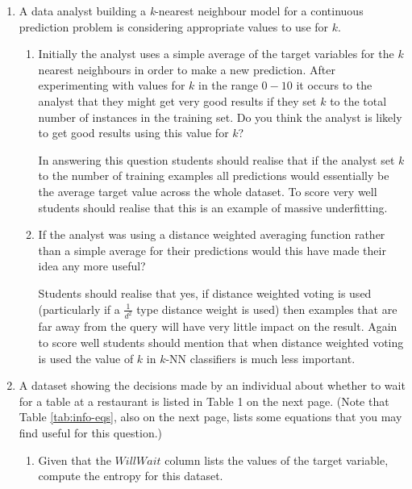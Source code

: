 \documentclass[solution]{ditpaper}
\begin{document}
\newpage


\newpage

\question 
	\begin{enumerate}
		\item A data analyst building a \emph{k}-nearest neighbour model for a continuous prediction problem is considering appropriate values to use for $k$. 
	\begin{enumerate}
		\item Initially the analyst uses a simple average of the target variables for the $k$ nearest neighbours in order to make a new prediction. After experimenting with values for $k$ in the range $0 - 10$ it occurs to the analyst that they might get very good results if they set $k$ to the total number of instances in the training set. Do you think the analyst is likely to get good results using this value for $k$?
\begin{answer}
In answering this question students should realise that if the analyst set $k$ to the number of training examples all predictions would essentially be the average target value across the whole dataset. To score very well students should realise that this is an example of massive underfitting.
\end{answer}
		\item If the analyst was using a distance weighted averaging function rather than a simple average for their predictions would this have made their idea any more useful?
\begin{answer}
Students should realise that yes, if distance weighted voting is used (particularly if a $\frac{1}{d^2}$ type distance weight is used) then examples that are far away from the query will have very little impact on the result. Again to score well students should mention that when distance weighted voting is used the value of $k$ in $k$-NN classifiers is much less important.
\end{answer}
	\end{enumerate}
		\item A dataset showing the decisions made by an individual about whether to wait for a table at a restaurant is listed in Table 1 on the next page. (Note that Table \ref{tab:info-eqs}, also on the next page, lists some equations that you may find useful for this question.)		
	\begin{enumerate}
		\item Given that the $WillWait$ column lists the values of the target variable, compute the entropy for this dataset.

\end{enumerate}
\end{enumerate}
\end{document}
